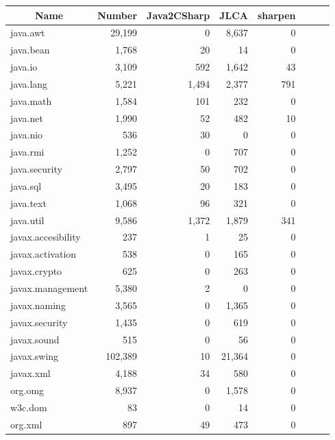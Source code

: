 \begin{table}[t]
\centering
\begin{SmallOut}
\begin {tabular} {|l|r|r|r|r|r|r|r|}
 \hline
\multicolumn{1}{|c}{\textbf{Name}} &
\multicolumn{1}{|c|}{\textbf{Number}} & \multicolumn{1}{|c|}{\textbf{Java2CSharp}} & \multicolumn{1}{|c|}{\textbf{JLCA}}& \multicolumn{1}{|c|}{\textbf{sharpen}} \\
\hline
java.awt  &  29,199 &  0     &    8,637  &    0   \\
\hline
java.bean &  1,768  &  20    &    14     &    0    \\
\hline
java.io   &  3,109  & 592   &   1,642   &   43   \\
\hline
java.lang &  5,221  & 1,494  &   2,377   &   791  \\
\hline
java.math &  1,584  & 101   &    232    &   0    \\
\hline
java.net  &  1,990  & 52    &   482     &   10    \\
\hline
java.nio  &  536    &  30    &    0      &   0    \\
\hline
java.rmi  &  1,252   &  0     &    707   &    0   \\
\hline
java.security & 2,797& 50  &    702    &  0    \\
\hline
java.sql   &  3,495 & 20   &     183   &   0   \\
\hline
java.text  &  1,068 & 96   &   321   &   0  \\
\hline
java.util  & 9,586  & 1,372  &   1,879   &   341   \\
\hline
javax.accesibility  & 237 &  1    &   25    &   0    \\
\hline
javax.activation    & 538 & 0    &   165   &   0     \\
\hline
javax.crypto        & 625 &  0    &    263  &    0    \\
\hline
javax.management   &  5,380 & 2    &    0     &   0     \\
\hline
javax.naming       &  3,565 & 0    &   1,365   &   0      \\
\hline
javax.security     &  1,435 & 0     &  619     &   0    \\
\hline
javax.sound        &  515   & 0    &   56    & 0     \\
\hline
javax.swing        & 102,389& 10   &  21,364 &   0   \\
\hline
javax.xml          &  4,188 & 34   &   580   &   0  \\
\hline
org.omg            &  8,937 & 0    &  1,578  &   0    \\
\hline
w3c.dom            &  83 & 0    &   14    & 0   \\
\hline
org.xml            &  897 &  49   &   473    &  0   \\
\hline
\end{tabular}%
 \label{table:package}
\end{SmallOut}\vspace*{-6ex}
\end{table}
